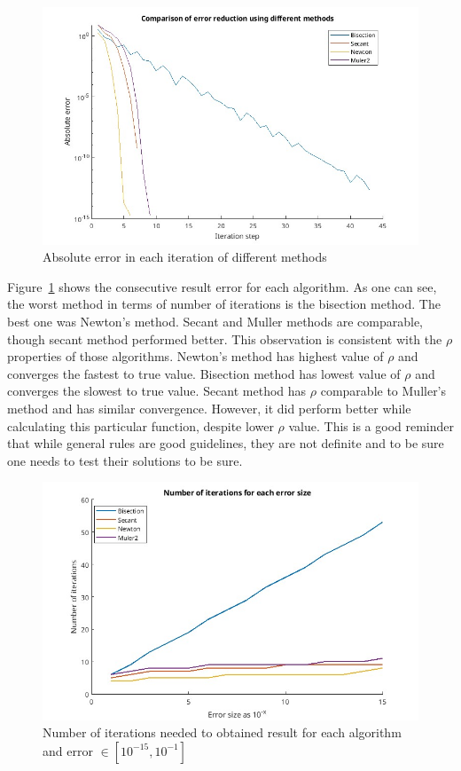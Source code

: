 \documentclass[11pt]{article}
\begin{document}
\begin{figure}[ht!]
    \includegraphics[width=\textwidth]{combined_test.jpg}
    \caption{Absolute error in each iteration of different methods}
    \label{fig:combinedtest}
\end{figure}

Figure~\ref{fig:combinedtest} shows the consecutive result error for each
algorithm. As one can see, the worst method in terms of number of iterations is
the bisection method. The best one was Newton's method. Secant and Muller
methods are comparable, though secant method performed better. This observation
is consistent with the $\rho$ properties of those algorithms. Newton's method
has highest value of $\rho$ and converges the fastest to true value. Bisection
method has lowest value of $\rho$ and converges the slowest to true value.
Secant method has $\rho$ comparable to Muller's method and has similar
convergence. However, it did perform better while calculating this particular
function, despite lower $\rho$ value. This is a good reminder that while
general rules are good guidelines, they are not definite and to be sure one
needs to test their solutions to be sure.

\begin{figure}[ht!]
    \includegraphics[width=\textwidth]{iter_per_error_size.jpg}
    \caption{Number of iterations needed to obtained result for each algorithm and error $\in [10^{-15}, 10^{-1}]$}
    \label{fig:iter_per_error_size}
\end{figure}
\end{document}
